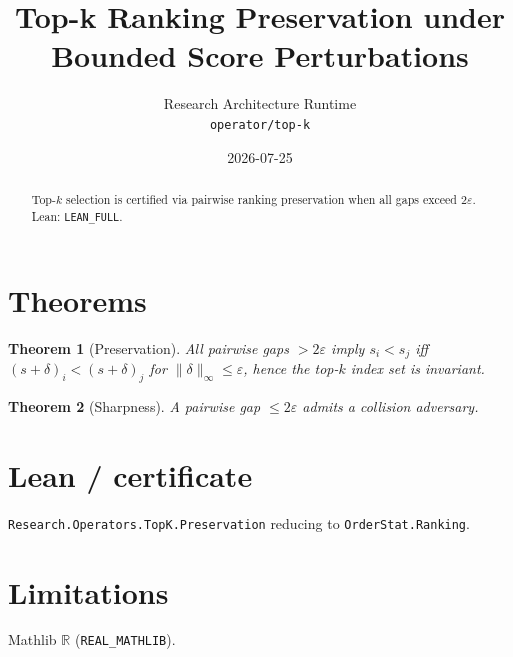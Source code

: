 \documentclass[11pt]{article}
\title{Top-k Ranking Preservation under Bounded Score Perturbations}
\author{Research Architecture Runtime \\ \texttt{operator/top-k}}
\date{2026-07-25}
\newtheorem{theorem}{Theorem}
\begin{document}
\maketitle
\begin{abstract}
Top-$k$ selection is certified via pairwise ranking preservation when all gaps
exceed $2\varepsilon$. Lean: \texttt{LEAN\_FULL}.
\end{abstract}
\section{Theorems}
\begin{theorem}[Preservation]
All pairwise gaps $>2\varepsilon$ imply $s_i<s_j$ iff $(s+\delta)_i<(s+\delta)_j$ for $\|\delta\|_\infty\le\varepsilon$, hence the top-$k$ index set is invariant.
\end{theorem}
\begin{theorem}[Sharpness]
A pairwise gap $\le 2\varepsilon$ admits a collision adversary.
\end{theorem}
\section{Lean / certificate}
\texttt{Research.Operators.TopK.Preservation} reducing to \texttt{OrderStat.Ranking}.
\section{Limitations}
Mathlib $\mathbb{R}$ (\texttt{REAL\_MATHLIB}).
\end{document}
